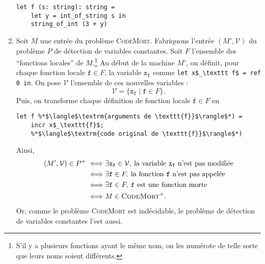 \begin{enumerate}
\begin{lstlisting}[language=caml,caption=Variable constante]
let f (s: string): string =
	let y = int_of_string s in
	string_of_int (3 + y)
		\end{lstlisting}
	\item Soit $M$\/ une entrée du problème \textsc{CodeMort}. Fabriquons l'entrée $(M', \mathcal{V})$\/ du problème $P$\/ de détection de variables constantes. Soit $F$\/ l'ensemble des ``fonctions locales'' de $M$.\footnote{S'il y a plusieurs fonctions ayant le même nom, on les numérote de telle sorte que leurs noms soient différents.}
		Au début de la machine $M'$, on définit, pour chaque fonction locale $\texttt{f} \in F$, la variable $\texttt{x}_\texttt{f}$\/ comme \lstinline[language=caml,mathescape]{let x$_\texttt f$ = ref 0 in}. On pose $\mathcal{V}$\/ l'ensemble de ces nouvelles variables : \[
			\mathcal{V} = \{ \texttt{x}_{\texttt{f}}  \mid \texttt{f} \in F\}
		.\]
		Puis, on transforme chaque définition de fonction locale $\texttt{f} \in F$ en
		\begin{lstlisting}[language=caml,mathescape]
let f %*$\langle$\textrm{arguments de \texttt{f}}$\rangle$*) =
	incr x$_\texttt{f}$;
	%*$\langle$\textrm{code original de \texttt{f}}$\rangle$*)
		\end{lstlisting}
		Ainsi,
		\begin{align*}
			(M', \mathcal{V}) \in P^+ \iff& \exists \texttt{x}_\texttt{f} \in \mathcal{V},\: \text{la variable } \texttt{x}_\texttt{f} \text{ n'est pas modifiée}  \\
			\iff& \exists \texttt{f} \in F,\: \text{la fonction \texttt{f} n'est pas appelée}  \\
			\iff& \exists \texttt{f} \in F,\: \texttt{f} \text{ est une fonction morte} \\
			\iff& M \in \textsc{CodeMort}^+.
		\end{align*}
		Or, comme le problème \textsc{CodeMort} est indécidable, le problème de détection de variables constantes l'est aussi.
\end{enumerate}
